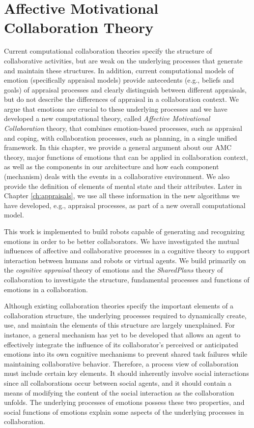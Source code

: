 \documentclass[12pt]{report}
\begin{document}
\chapter{Affective Motivational Collaboration Theory}
\label{ch:amct}
\vspace*{-5mm}
Current computational collaboration theories specify the structure of
collaborative activities, but are weak on the underlying processes that generate
and maintain these structures. {\color{red}In addition, current computational
models of emotion (specifically appraisal models) provide antecedents (e.g.,
beliefs and goals) of appraisal processes and clearly distinguish between
different appraisals, but do not describe the differences of appraisal in a
collaboration context.} We argue that emotions are crucial to these underlying
processes and we have developed a new computational theory, called
\textit{Affective Motivational Collaboration} theory, that combines
emotion-based processes, such as appraisal and coping, with collaboration
processes, such as planning, in a single unified framework. {\color{red}In this
chapter, we provide a general argument about our AMC theory, major functions of
emotions that can be applied in collaboration context, as well as the components
in our architecture and how each component (mechanism) deals with the events in
a collaborative environment. We also provide the definition of elements of
mental state and their attributes. Later in Chapter \ref{ch:appraisals}, we use
all these information in the new algorithms we have developed, e.g., appraisal
processes, as part of a new overall computational model.}

This work is implemented to build robots capable of generating and recognizing
emotions in order to be better collaborators. We have investigated the mutual
influences of affective and collaborative processes in a cognitive theory to
support interaction between humans and robots or virtual agents. We build
primarily on the \textit{cognitive appraisal} theory of emotions and the
\textit{SharedPlans} theory of collaboration to investigate the structure,
fundamental processes and functions of emotions in a collaboration.

Although existing collaboration theories specify the important elements of a
collaboration structure, the underlying processes required to dynamically
create, use, and maintain the elements of this structure are largely
unexplained. For instance, a general mechanism has yet to be developed that
allows an agent to effectively integrate the influence of its collaborator's
perceived or anticipated emotions into its own cognitive mechanisms to prevent
shared task failures while maintaining collaborative behavior. Therefore, a
process view of collaboration must include certain key elements. It should
inherently involve social interactions since all collaborations occur between
social agents, and it should contain a means of modifying the content of the
social interaction as the collaboration unfolds. The underlying processes of
emotions possess these two properties, and social functions of emotions explain
some aspects of the underlying processes in collaboration.
\end{document}
